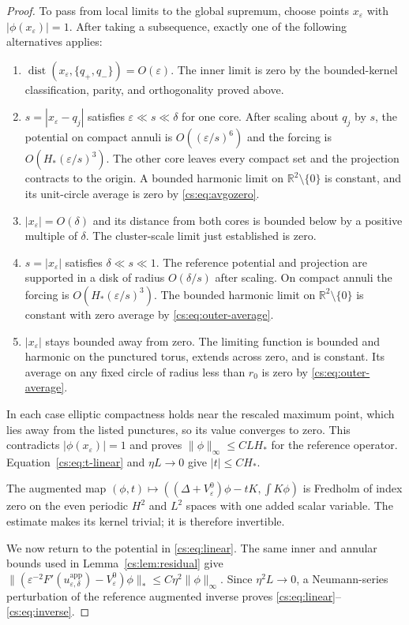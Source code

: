 \documentclass[11pt,reqno]{amsart}
\numberwithin{equation}{section}
\theoremstyle{definition}
\theoremstyle{remark}
\newcommand{\R}{\mathbb R}
\newcommand{\eps}{\varepsilon}
\newcommand{\dist}{\operatorname{dist}}
\begin{document}
\begin{proof}
To pass from local limits to the global supremum, choose points
$x_\eps$ with $|\phi(x_\eps)|=1$. After taking a subsequence,
exactly one of the following alternatives applies:
\begin{enumerate}[label=(\roman*),leftmargin=*]
\item $\dist(x_\eps,\{q_+,q_-\})=O(\eps)$.
The inner limit is zero by the bounded-kernel classification,
parity, and orthogonality proved above.
\item $s=|x_\eps-q_j|$ satisfies $\eps\ll s\ll\delta$ for one core.
After scaling about $q_j$ by $s$, the potential on compact annuli
is $O((\eps/s)^6)$ and the forcing is $O(H_*(\eps/s)^3)$.
The other core leaves every compact set and the projection
contracts to the origin. A bounded harmonic limit on
$\R^2\setminus\{0\}$ is constant, and its unit-circle average is
zero by \eqref{cs:eq:avgozero}.
\item $|x_\eps|=O(\delta)$ and its distance from both cores is
bounded below by a positive multiple of $\delta$.
The cluster-scale limit just established is zero.
\item $s=|x_\eps|$ satisfies $\delta\ll s\ll1$.
The reference potential and projection are supported in a disk
of radius $O(\delta/s)$ after scaling. On compact annuli the
forcing is $O(H_*(\eps/s)^3)$. The bounded harmonic limit on
$\R^2\setminus\{0\}$ is constant with zero average by
\eqref{cs:eq:outer-average}.
\item $|x_\eps|$ stays bounded away from zero.
The limiting function is bounded and harmonic on the punctured
torus, extends across zero, and is constant. Its average on any
fixed circle of radius less than $r_0$ is zero by
\eqref{cs:eq:outer-average}.
\end{enumerate}
In each case elliptic compactness holds near the rescaled maximum
point, which lies away from the listed punctures, so its value
converges to zero. This contradicts $|\phi(x_\eps)|=1$ and proves
$\|\phi\|_\infty\le CLH_*$ for the reference operator.
Equation~\eqref{cs:eq:t-linear} and $\eta L\to0$ give $|t|\le CH_*$.

The augmented map
$(\phi,t)\mapsto((\Delta+V_\eps^0)\phi-tK,\int K\phi)$
is Fredholm of index zero on the even periodic $H^2$ and $L^2$
spaces with one added scalar variable. The estimate makes its
kernel trivial; it is therefore invertible.

We now return to the potential in \eqref{cs:eq:linear}.
The same inner and annular bounds used in Lemma~\ref{cs:lem:residual} give
\(
 \|(\eps^{-2}F'(u^{\mathrm{app}}_{\eps,\delta})-V_\eps^0)\phi\|_*
                      \le C\eta^2\|\phi\|_\infty .
\)
Since $\eta^2L\to0$, a Neumann-series perturbation of the reference
augmented inverse proves \eqref{cs:eq:linear}--\eqref{cs:eq:inverse}.
\end{proof}
\end{document}
